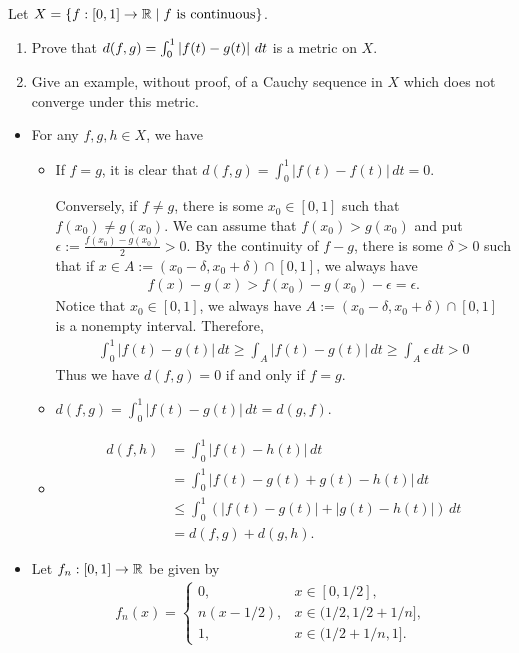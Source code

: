 \begin{problem}
Let $X = \left\{ f: [0,1] \to \mathbb{R} \mid f \text{ is continuous}\right\}$.
\begin{enumerate}
    \item[(a)] Prove that $d(f,g) = \int_0^1 \left\lvert f(t) - g(t)\right\rvert \,dt$ is a metric on $X$.
    \item[(b)] Give an example, without proof, of a Cauchy sequence in $X$ which does not converge under this metric.
\end{enumerate}
\begin{solution}
\begin{itemize}
    \item[(a)] For any $f,g,h \in X$, we have
    \begin{itemize}
        \item If $f = g$, it is clear that $d(f,g) = \int_0^1 |f(t)-f(t)| \,dt = 0$.
        
        Conversely, if $f \ne g$, there is some $x_0 \in [0,1]$ such that $f(x_0) \ne g(x_0)$. We can assume that $f(x_0) > g(x_0)$ and put $\epsilon := \frac{f(x_0) - g(x_0)}{2} > 0$. By the continuity of $f - g$, there is some $\delta > 0$ such that if $x \in A := (x_0-\delta, x_0+\delta) \cap [0,1]$, we always have 
        \begin{align*}
            f(x) - g(x) > f(x_0) - g(x_0) - \epsilon = \epsilon.
        \end{align*}
        Notice that $x_0 \in [0,1]$, we always have $A := (x_0-\delta, x_0+\delta) \cap [0,1]$ is a nonempty interval. Therefore, 
        \begin{align*}
            \int_{0}^1 |f(t)-g(t)| \,dt \ge \int_A |f(t)-g(t)| \,dt \ge \int_A \epsilon \,dt > 0
        \end{align*}
        Thus we have $d(f,g) = 0$ if and only if $f = g$.
        \item $d(f,g) = \int_0^1 |f(t) - g(t)| \,dt = d(g,f)$.
        \item \begin{align*}
            d(f,h) &= \int_0^1 |f(t)-h(t)| \,dt \\
            &= \int_0^1 |f(t) - g(t) + g(t) - h(t)| \,dt \\
            &\le \int_0^1 (|f(t) - g(t)| + |g(t) - h(t)|) \,dt \\
            &= d(f,g) + d(g,h).
        \end{align*}
    \end{itemize}
    \item[(b)] Let $f_n: [0,1] \to \mathbb{R}$ be given by
    \begin{align*}
        f_n(x) = \begin{cases}
        0, &x \in [0,1/2], \\
        n(x-1/2), &x \in (1/2, 1/2 + 1/n], \\
        1, &x \in (1/2 + 1/n, 1].
        \end{cases}
    \end{align*}
    \end{itemize}
\end{solution}
\end{problem}

